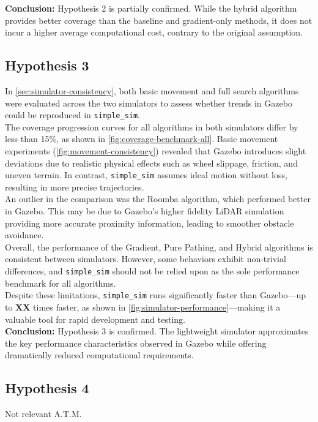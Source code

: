 \textbf{Conclusion:} Hypothesis 2 is partially confirmed. While the hybrid algorithm provides better coverage than the baseline and gradient-only methods, it does not incur a higher average computational cost, contrary to the original assumption.

\subsection{Hypothesis 3}
In \cref{sec:simulator-consistency}, both basic movement and full search algorithms were evaluated across the two simulators to assess whether trends in Gazebo could be reproduced in \texttt{simple\_sim}.\\

The coverage progression curves for all algorithms in both simulators differ by less than 15\%, as shown in \cref{fig:coverage-benchmark-all}. Basic movement experiments (\cref{fig:movement-consistency}) revealed that Gazebo introduces slight deviations due to realistic physical effects such as wheel slippage, friction, and uneven terrain. In contrast, \texttt{simple\_sim} assumes ideal motion without loss, resulting in more precise trajectories.\\

An outlier in the comparison was the Roomba algorithm, which performed better in Gazebo. This may be due to Gazebo’s higher fidelity LiDAR simulation providing more accurate proximity information, leading to smoother obstacle avoidance.\\

Overall, the performance of the Gradient, Pure Pathing, and Hybrid algorithms is consistent between simulators. However, some behaviors exhibit non-trivial differences, and \texttt{simple\_sim} should not be relied upon as the sole performance benchmark for all algorithms.\\

Despite these limitations, \texttt{simple\_sim} runs significantly faster than Gazebo—up to \textbf{XX} times faster, as shown in \cref{fig:simulator-performance}—making it a valuable tool for rapid development and testing.\\

\textbf{Conclusion:} Hypothesis 3 is confirmed. The lightweight simulator approximates the key performance characteristics observed in Gazebo while offering dramatically reduced computational requirements.

\subsection{Hypothesis 4}
Not relevant A.T.M.
